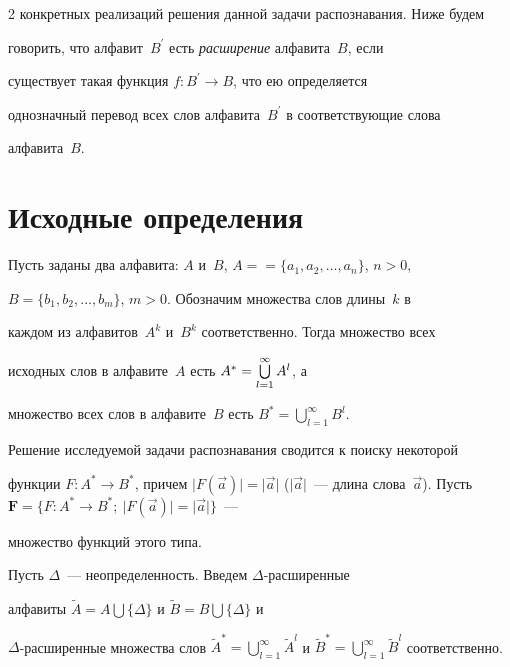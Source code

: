 \begin{multicols}{2}
конкретных реализаций решения данной задачи распознавания. Ниже будем 

говорить, что алфавит~$B^\prime$ есть \textit{расширение} алфавита~$B$, если 

существует такая функция $f: B^\prime\rightarrow B$, что ею определяется 

однозначный перевод всех слов алфавита~$B^\prime$ в соответствующие слова 

ал\-фа\-ви\-та~$B$.






\section{Исходные определения}



Пусть заданы два алфавита: $A$ и~$B$, $A =$\linebreak $= \{a_1, a_2, \ldots , a_n\}$, $n > 0$, 

$B = \{b_1, b_2, \ldots , b_m\}$, $m > 0$. Обозначим множества слов длины~$k$ в 

каждом из алфавитов~$A^k$ и~$B^k$ соответственно. Тогда множество всех 

исходных слов в алфавите~$A$ есть $A^* =\bigcup\protect\limits_{l=1}^\infty A^l$, а 

множество всех слов в алфавите~$B$ есть $B^*=\bigcup\limits_{l=1}^\infty B^l$. 

Решение исследуемой задачи распознавания сводится к поиску некоторой 

функции $F: A^* \rightarrow B^*$, причем $\vert F(\vec{a})\vert =\vert 

\vec{a}\vert$ ($\vert\vec{a}\vert$~--- длина слова~$\vec{a}$). Пусть $\mathbf{F} 

= \{F: A^*\rightarrow B^*;\ \vert F (\vec{a})\vert =\vert\vec{a}\vert\}$~--- 

множество функций этого типа.



    Пусть $\Delta$~--- неопределенность. Введем $\Delta$-рас\-ши\-рен\-ные 

алфавиты $\tilde{A}=A\bigcup\{\Delta\}$ и $\tilde{B}=B\bigcup\{\Delta\}$ и 

$\Delta$-рас\-ши\-рен\-ные множества слов $\tilde{A}^*=\bigcup\limits_{l=1}^\infty 

\tilde{A}^l$ и  $\tilde{B}^*=\bigcup\limits_{l=1}^\infty \tilde{B}^l$ соответственно. 




\end{multicols}
